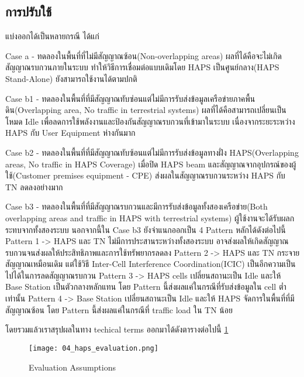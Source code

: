 \subsection{การปรับใช้}
แบ่งออกได้เป็นหลายกรณี ได้แก่

\begin{description}
    \item Case a - ทดลองในพื้นที่ที่ไม่มีสัญญาณซ้อน(Non-overlapping areas) ผลที่ได้คือจะไม่เกิดสัญญาณรบกวนภายในระบบ
            ทำให้วิธีการเชื่อมต่อแบบเดิมโดย HAPS เป็นศูนย์กลาง(HAPS Stand-Alone) ยังสามารถใช้งานได้ตามปกติ
    \item Case b1 - ทดลองในพื้นที่ที่มีสัญญาณทับซ่อนแต่ไม่มีการรับส่งข้อมูลเครือข่ายภาคพื้นดิน(Overlapping area, No traffic in terrestrial systems)
            ผลที่ได้คือสามารถเปลี่ยนเป็นโหมด Idle เพื่อลดการใช้พลังงานและป้องกันสัญญาณรบกวนที่เข้ามาในระบบ เนื่องจากระยะระหว่าง HAPS กับ User Equipment ห่างกันมาก
    \item Case b2 - ทดลองในพื้นที่ที่มีสัญญาณทับซ้อนแต่ไม่มีการรับส่งข้อมูลทางฝั่ง HAPS(Overlapping areas, No traffic in HAPS Coverage)
            เมื่อปิด HAPS beam และสัญญาณจากอุปกรณ์ของผู้ใช้(Customer premises equipment - CPE) ส่งผลในสัญญาณรบกวนระหว่าง HAPS กับ TN ลดลงอย่างมาก
    \item Case b3 - ทดลองในพื้นที่ที่มีสัญญาณรบกวนและมีการรับส่งข้อมูลทั้งสองเครือข่าย(Both overlapping areas and traffic in HAPS with terrestrial systems)
            ผู้ใช้งานจะได้รับผลกระทบจากทั้งสองระบบ นอกจากนี้ใน Case b3 ยังจำแนกออกเป็น 4 Pattern หลักได้ดังต่อไปนี้ 
            Pattern 1 -> HAPS และ TN ไม่มีการประสานระหว่างทั้งสองระบบ อาจส่งผลให้เกิดสัญญาณรบกวนจนส่งผลให้ประสิทธิภาพและการใช้ทรัพยากรลดลง
            Pattern 2 -> HAPS และ TN กระจายสัญญาณเหมือนเดิม แต่ใช้วิธี Inter-Cell Interference Coordination(ICIC) เป็นอีกความเป็นไปได้ในการลดสัญญาณรบกวน
            Pattern 3 -> HAPS cells เปลี่ยนสถานะเป็น Idle และให้ Base Station เป็นตัวกลางหลักแทน โดย Pattern นี้ส่งผลแค่ในกรณีที่รับส่งข้อมูลใน cell ต่ำเท่านั้น
            Pattern 4 -> Base Station เปลี่ยนสถานะเป็น Idle และให้ HAPS จัดการในพื้นที่ที่มีสัญญาณซ้อน โดย Pattern นี้ส่งผลแค่ในกรณีที่ traffic load ใน TN น้อย
\end{description}

โดยรวมแล้วเราสรุปผลในทาง techical terms ออกมาได้ดังตารางต่อไปนี้ \ref{fig:04-haps-evaluation}

\begin{figure}[h]
\centering
\caption[]{Evaluation Assumptions}
\label{fig:04-haps-evaluation} 
\texttt{[image: 04\_haps\_evaluation.png]}
\end{figure}

